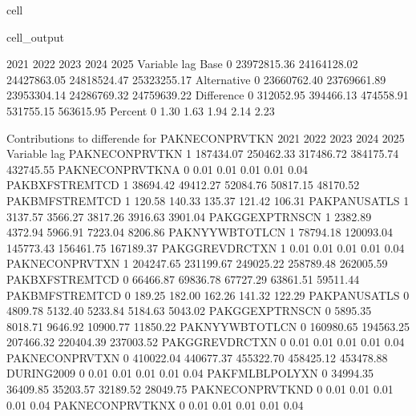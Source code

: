 \documentclass[letterpaper,10pt,english]{jupyterBook}
\begin{document}
\begin{sphinxuseclass}{cell}
\begin{sphinxVerbatimOutput}
\begin{sphinxuseclass}{cell_output}
\begin{sphinxVerbatim}[commandchars=\\\{\}]
                       2021        2022        2023        2024        2025
Variable    lag                                                            
Base        0   23972815.36 24164128.02 24427863.05 24818524.47 25323255.17
Alternative 0   23660762.40 23769661.89 23953304.14 24286769.32 24759639.22
Difference  0    \PYGZhy{}312052.95  \PYGZhy{}394466.13  \PYGZhy{}474558.91  \PYGZhy{}531755.15  \PYGZhy{}563615.95
Percent     0         \PYGZhy{}1.30       \PYGZhy{}1.63       \PYGZhy{}1.94       \PYGZhy{}2.14       \PYGZhy{}2.23

 Contributions to differende for  PAKNECONPRVTKN
                           2021       2022       2023       2024       2025
Variable         lag                                                       
PAKNECONPRVTKN   \PYGZhy{}1  \PYGZhy{}187434.07 \PYGZhy{}250462.33 \PYGZhy{}317486.72 \PYGZhy{}384175.74 \PYGZhy{}432745.55
PAKNECONPRVTKN\PYGZus{}A  0       \PYGZhy{}0.01      \PYGZhy{}0.01      \PYGZhy{}0.01      \PYGZhy{}0.01      \PYGZhy{}0.04
PAKBXFSTREMTCD   \PYGZhy{}1   \PYGZhy{}38694.42  \PYGZhy{}49412.27  \PYGZhy{}52084.76  \PYGZhy{}50817.15  \PYGZhy{}48170.52
PAKBMFSTREMTCD   \PYGZhy{}1      120.58     140.33     135.37     121.42     106.31
PAKPANUSATLS     \PYGZhy{}1     3137.57    3566.27    3817.26    3916.63    3901.04
PAKGGEXPTRNSCN   \PYGZhy{}1    \PYGZhy{}2382.89   \PYGZhy{}4372.94   \PYGZhy{}5966.91   \PYGZhy{}7223.04   \PYGZhy{}8206.86
PAKNYYWBTOTLCN   \PYGZhy{}1   \PYGZhy{}78794.18 \PYGZhy{}120093.04 \PYGZhy{}145773.43 \PYGZhy{}156461.75 \PYGZhy{}167189.37
PAKGGREVDRCTXN   \PYGZhy{}1       \PYGZhy{}0.01      \PYGZhy{}0.01      \PYGZhy{}0.01      \PYGZhy{}0.01      \PYGZhy{}0.04
PAKNECONPRVTXN   \PYGZhy{}1   204247.65  231199.67  249025.22  258789.48  262005.59
PAKBXFSTREMTCD    0    66466.87   69836.78   67727.29   63861.51   59511.44
PAKBMFSTREMTCD    0     \PYGZhy{}189.25    \PYGZhy{}182.00    \PYGZhy{}162.26    \PYGZhy{}141.32    \PYGZhy{}122.29
PAKPANUSATLS      0    \PYGZhy{}4809.78   \PYGZhy{}5132.40   \PYGZhy{}5233.84   \PYGZhy{}5184.63   \PYGZhy{}5043.02
PAKGGEXPTRNSCN    0     5895.35    8018.71    9646.92   10900.77   11850.22
PAKNYYWBTOTLCN    0   160980.65  194563.25  207466.32  220404.39  237003.52
PAKGGREVDRCTXN    0       \PYGZhy{}0.01      \PYGZhy{}0.01      \PYGZhy{}0.01      \PYGZhy{}0.01      \PYGZhy{}0.04
PAKNECONPRVTXN    0  \PYGZhy{}410022.04 \PYGZhy{}440677.37 \PYGZhy{}455322.70 \PYGZhy{}458425.12 \PYGZhy{}453478.88
DURING\PYGZus{}2009       0       \PYGZhy{}0.01      \PYGZhy{}0.01      \PYGZhy{}0.01      \PYGZhy{}0.01      \PYGZhy{}0.04
PAKFMLBLPOLYXN    0   \PYGZhy{}34994.35  \PYGZhy{}36409.85  \PYGZhy{}35203.57  \PYGZhy{}32189.52  \PYGZhy{}28049.75
PAKNECONPRVTKN\PYGZus{}D  0       \PYGZhy{}0.01      \PYGZhy{}0.01      \PYGZhy{}0.01      \PYGZhy{}0.01      \PYGZhy{}0.04
PAKNECONPRVTKN\PYGZus{}X  0       \PYGZhy{}0.01      \PYGZhy{}0.01      \PYGZhy{}0.01      \PYGZhy{}0.01      \PYGZhy{}0.04


\end{sphinxVerbatim}
\end{sphinxuseclass}
\end{sphinxVerbatimOutput}
\end{sphinxuseclass}
\end{document}
